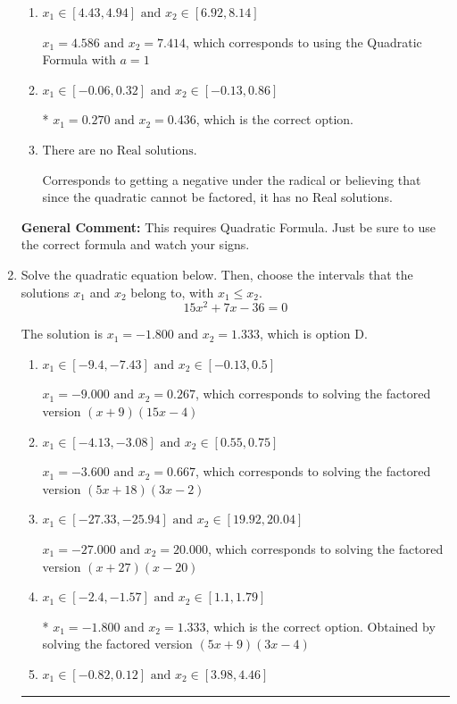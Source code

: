 \documentclass{extbook}[14pt]
\newcommand{\litem}[1]{\item #1

\rule{\textwidth}{0.4pt}}
\begin{document}
\begin{enumerate}
{\begin{enumerate}[label=\Alph*.]
 $x_1 = -0.436 \text{ and } x_2 = -0.270$, which corresponds to writing the Quadratic Formula as $\frac{b \pm \sqrt{b^2 - 4ac}}{2a}$
\item \( x_1 \in [4.43, 4.94] \text{ and } x_2 \in [6.92, 8.14] \)

 $x_1 = 4.586 \text{ and } x_2 = 7.414$, which corresponds to using the Quadratic Formula with $a=1$
\item \( x_1 \in [-0.06, 0.32] \text{ and } x_2 \in [-0.13, 0.86] \)

* $x_1 = 0.270 \text{ and } x_2 = 0.436$, which is the correct option.
\item \( \text{There are no Real solutions.} \)

Corresponds to getting a negative under the radical or believing that since the quadratic cannot be factored, it has no Real solutions.
\end{enumerate}

\textbf{General Comment:} This requires Quadratic Formula. Just be sure to use the correct formula and watch your signs.
}
\litem{
Solve the quadratic equation below. Then, choose the intervals that the solutions $x_1$ and $x_2$ belong to, with $x_1 \leq x_2$.
\[ 15x^{2} +7 x -36 = 0 \]

The solution is \( x_1 = -1.800 \text{ and } x_2 = 1.333 \), which is option D.\begin{enumerate}[label=\Alph*.]
\item \( x_1 \in [-9.4, -7.43] \text{ and } x_2 \in [-0.13, 0.5] \)

$x_1 = -9.000 \text{ and } x_2 = 0.267$, which corresponds to solving the factored version $(x + 9)(15x -4)$
\item \( x_1 \in [-4.13, -3.08] \text{ and } x_2 \in [0.55, 0.75] \)

$x_1 = -3.600 \text{ and } x_2 = 0.667$, which corresponds to solving the factored version $(5x + 18)(3x -2)$
\item \( x_1 \in [-27.33, -25.94] \text{ and } x_2 \in [19.92, 20.04] \)

$x_1 = -27.000 \text{ and } x_2 = 20.000$, which corresponds to solving the factored version $(x + 27)(x -20)$
\item \( x_1 \in [-2.4, -1.57] \text{ and } x_2 \in [1.1, 1.79] \)

* $x_1 = -1.800 \text{ and } x_2 = 1.333$, which is the correct option. Obtained by solving the factored version $(5x + 9)(3x -4)$
\item \( x_1 \in [-0.82, 0.12] \text{ and } x_2 \in [3.98, 4.46] \)


\end{enumerate}}
\end{enumerate}
\end{document}
